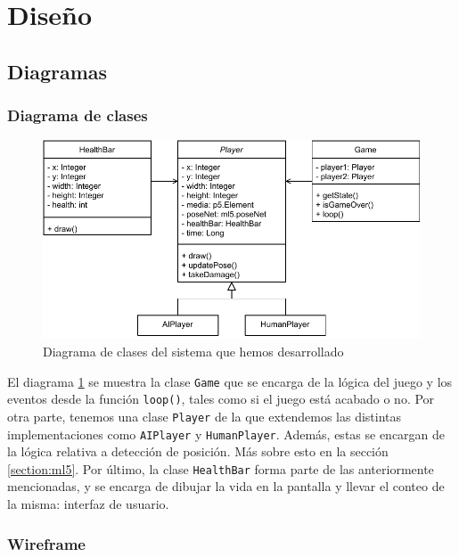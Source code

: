 \documentclass{article}
\begin{document}
\section{Diseño}
\label{section:design}

\subsection{Diagramas}

\subsubsection{Diagrama de clases}

\begin{figure}[H]
    \centering
    \includegraphics[width=\textwidth]{img/class-diagram}
    \caption{Diagrama de clases del sistema que hemos desarrollado}
    \label{fig:class-diagram}
\end{figure}

El diagrama \ref{fig:class-diagram} se muestra la clase \texttt{Game} que se encarga de la lógica del juego y los eventos desde la función \texttt{loop()}, tales como si el juego está acabado o no. Por otra parte, tenemos una clase \texttt{Player} de la que extendemos las distintas implementaciones como \texttt{AIPlayer} y \texttt{HumanPlayer}. Además, estas se encargan de la lógica relativa a detección de posición. Más sobre esto en la sección \ref{section:ml5}. Por último, la clase \texttt{HealthBar} forma parte de las anteriormente mencionadas, y se encarga de dibujar la vida en la pantalla y llevar el conteo de la misma: interfaz de usuario.

\subsubsection{Wireframe}
\end{document}

